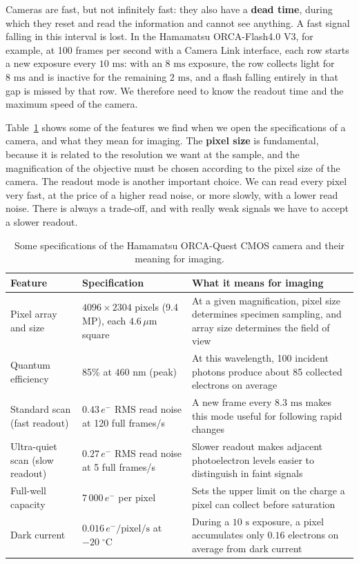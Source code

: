 \documentclass[letterpaper,11pt,leqno]{book}
\begin{document}
Cameras are fast, but not infinitely fast: they also have a \textbf{dead time}, during which they reset and read the information and cannot see anything. A fast signal falling in this interval is lost. In the Hamamatsu ORCA-Flash4.0 V3, for example, at 100 frames per second with a Camera Link interface, each row starts a new exposure every $10\text{ ms}$: with an $8\text{ ms}$ exposure, the row collects light for $8\text{ ms}$ and is inactive for the remaining $2\text{ ms}$, and a flash falling entirely in that gap is missed by that row. We therefore need to know the readout time and the maximum speed of the camera.

Table~\ref{tab:orca_quest_specs} shows some of the features we find when we open the specifications of a camera, and what they mean for imaging. The \textbf{pixel size} is fundamental, because it is related to the resolution we want at the sample, and the magnification of the objective must be chosen according to the pixel size of the camera. The readout mode is another important choice. We can read every pixel very fast, at the price of a higher read noise, or more slowly, with a lower read noise. There is always a trade-off, and with really weak signals we have to accept a slower readout.

\begin{table}[h]
\centering
\caption{Some specifications of the Hamamatsu ORCA-Quest CMOS camera and their meaning for imaging.}
\label{tab:orca_quest_specs}
\begin{tabular*}{\textwidth}{p{2.8cm}@{\extracolsep\fill}p{4.6cm}p{6.4cm}}
\toprule
Feature & Specification & What it means for imaging \\
\midrule
Pixel array and size & $4096 \times 2304$ pixels (9.4\,MP), each $4.6\,\mu\text{m}$ square & At a given magnification, pixel size determines specimen sampling, and array size determines the field of view \\
Quantum efficiency & 85\% at $460\text{ nm}$ (peak) & At this wavelength, 100 incident photons produce about 85 collected electrons on average \\
Standard scan (fast readout) & $0.43\,e^-$ RMS read noise at 120 full frames/s & A new frame every $8.3\text{ ms}$ makes this mode useful for following rapid changes \\
Ultra-quiet scan (slow readout) & $0.27\,e^-$ RMS read noise at 5 full frames/s & Slower readout makes adjacent photoelectron levels easier to distinguish in faint signals \\
Full-well capacity & $7\,000\,e^-$ per pixel & Sets the upper limit on the charge a pixel can collect before saturation \\
Dark current & $0.016\,e^-/\text{pixel/s}$ at $-20\;^\circ\text{C}$ & During a $10\text{ s}$ exposure, a pixel accumulates only $0.16$ electrons on average from dark current \\
\bottomrule
\end{tabular*}
\end{table}
\end{document}
